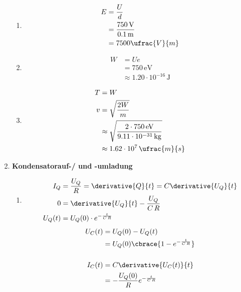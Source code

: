 \documentclass[11pt,letterpaper]{article}
\begin{document}
\begin{enumerate}
\begin{enumerate}
            \item
            \begin{align*}
                E &= \frac{U}{d}\\
                &= \frac{750\,\mathrm{V}}{0.1\,\mathrm{m}}\\
                &= 7500 \ufrac{V}{m}
            \end{align*}

            \item
            \begin{align*}
                W &= U e\\
                &= 750 \,\mathrm{eV}\\
                &\approx 1.20 \cdot 10^{-16} \,\mathrm{J}
            \end{align*}

            \item
            \begin{align*}
                T &= W\\
                v &= \sqrt{\frac{2W}{m}}\\
                &\approx \sqrt{\frac{2\cdot 750 \,\mathrm{eV}}{9.11\cdot 10^{-31}\,\mathrm{kg}}}\\
                &\approx 1.62\cdot 10^{7}\,\ufrac{m}{s}
            \end{align*}

        \end{enumerate}

    
    \item \textbf{Kondensatorauf-/ und -umladung}
        \begin{enumerate}
            \item
            \begin{align*}
                I_{Q} &= \frac{U_Q}{R} = \derivative{Q}{t} = C \derivative{U_Q}{t}\\
                0 &=  \derivative{U_Q}{t} -\frac{U_Q}{C\,R}\\
                U_Q(t) &= U_Q(0)\cdot e^{-\frac{t}{C\,R}}\\
            \end{align*}
            \begin{align*}
                U_C(t) &= U_Q(0) - U_Q(t)\\
                &= U_Q(0)\cbrace{1- e^{-\frac{t}{C\,R}}}\\
                \\
                I_{C}(t) &= C \derivative{U_C(t)}{t}\\
                &= -\frac{U_Q(0)}{R}e^{-\frac{t}{C\,R}}
            \end{align*}


\end{enumerate}
\end{enumerate}
\end{document}
